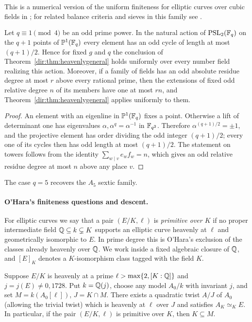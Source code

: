 This is a numerical version of the uniform finiteness for elliptic curves over cubic
fields in \cite[Proposition~7.5]{RasmussenTamagawa2017Arithmetic}; for related balance
criteria and sieves in this family see \cite{OHara2026Heavenly}.

\begin{proposition}\label{dir:prop:heavenlypsl}
Let $q\equiv1\pmod4$ be an odd prime power. In the natural action of $\operatorname{PSL}_2(\mathbb{F}_q)$ on
the $q+1$ points of $\mathbb P^1(\mathbb{F}_q)$ every element has an odd cycle of length at
most $(q+1)/2$. Hence for fixed $g$ and $q$ the conclusion of
Theorem~\ref{dir:thm:heavenlygeneral} holds uniformly over every number field realizing this
action. Moreover, if a family of fields has an odd absolute residue degree at most $r$
above every rational prime, then the extensions of fixed odd relative degree $n$ of
its members have one at most $rn$, and Theorem~\ref{dir:thm:heavenlygeneral} applies
uniformly to them.
\end{proposition}

\begin{proof}
An element with an eigenline in $\mathbb P^1(\mathbb{F}_q)$ fixes a point. Otherwise a lift of
determinant one has eigenvalues $\alpha,\alpha^q=\alpha^{-1}$ in $\mathbb{F}_{q^2}$. Therefore
$\alpha^{(q+1)/2}=\pm1$, and the projective element has order dividing the odd integer
$(q+1)/2$; every one of its cycles then has odd length at most $(q+1)/2$. The statement
on towers follows from the identity $\sum_{w\mid v}e_wf_w=n$, which gives an odd
relative residue degree at most $n$ above any place $v$.
\end{proof}

The case $q=5$ recovers the $A_5$ sextic family.

\paragraph{O'Hara's finiteness questions and descent.}
For elliptic curves we say that a pair $(E/K,\ell)$ is \emph{primitive over $K$} if no
proper intermediate field $\mathbb{Q}\subseteq k\subsetneq K$ supports an elliptic curve
heavenly at $\ell$ and geometrically isomorphic to $E$. In prime degree this is
O'Hara's exclusion of the classes already heavenly over $\mathbb{Q}$. We work inside a fixed
algebraic closure of $\mathbb{Q}$, and $[E]_K$ denotes a $K$-isomorphism class tagged with the
field $K$.

\begin{lemma}\label{dir:lem:descent}
Suppose $E/K$ is heavenly at a prime $\ell>\max\{2,[K:\mathbb{Q}]\}$ and $j=j(E)\ne0,1728$.
Put $k=\mathbb{Q}(j)$, choose any model $A_0/k$ with invariant $j$, and set $M=k(A_0[\ell])$,
$J=K\cap M$. There exists a quadratic twist $A/J$ of $A_0$ (allowing the trivial twist)
which is heavenly at $\ell$ over $J$ and satisfies $A_K\simeq_KE$. In particular, if
the pair $(E/K,\ell)$ is primitive over $K$, then $K\subseteq M$.
\end{lemma}

